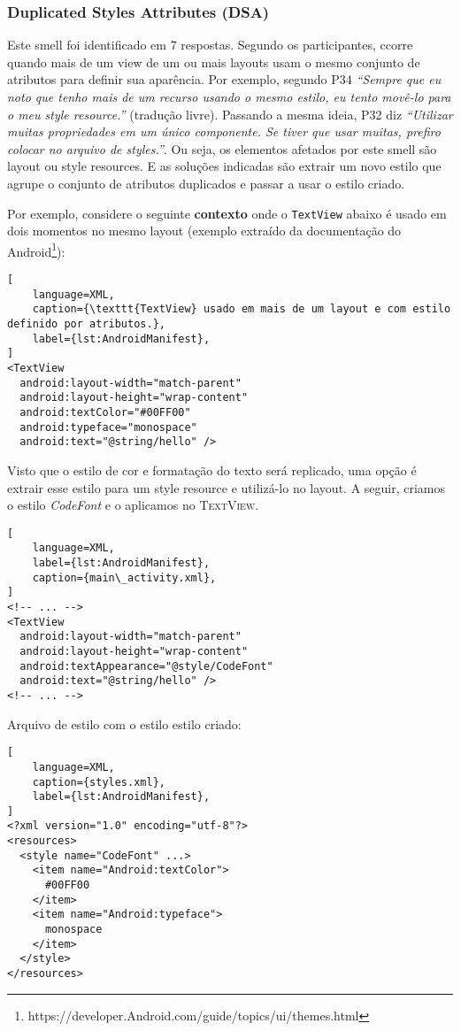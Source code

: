 \subsubsection{Duplicated Styles Attributes (DSA)}
Este smell foi identificado em 7 respostas. Segundo os participantes, ccorre quando mais de um view de um ou mais layouts usam o mesmo conjunto de atributos para definir sua apar\^encia. Por exemplo, segundo P34 \textit{``Sempre que eu noto que tenho mais de um recurso usando o mesmo estilo, eu tento mov\^e-lo para o meu \textit{style resource}.''} (tradu\c{c}\~ao livre). Passando a mesma ideia, P32 diz \textit{``Utilizar muitas propriedades em um único componente. Se tiver que usar muitas, prefiro colocar no arquivo de styles.''}. Ou seja, os elementos afetados por este smell s\~ao layout ou style resources. E as solu\c{c}\~oes indicadas s\~ao extrair um novo estilo que agrupe o conjunto de atributos duplicados e passar a usar o estilo criado.

Por exemplo, considere o seguinte \textbf{contexto} onde o \texttt{TextView} abaixo \'e usado em dois momentos no mesmo layout (exemplo extra\'ido da documenta\c{c}\~ao do Android\footnote{https://developer.Android.com/guide/topics/ui/themes.html}):

\begin{lstlisting}[
	language=XML, 
	caption={\texttt{TextView} usado em mais de um layout e com estilo definido por atributos.}, 
	label={lst:AndroidManifest},
]
<TextView
  android:layout-width="match-parent"
  android:layout-height="wrap-content"
  android:textColor="#00FF00"
  android:typeface="monospace"
  android:text="@string/hello" />
\end{lstlisting}

Visto que o estilo de cor e formata\c{c}\~ao do texto ser\'a replicado, uma op\c{c}\~ao \'e extrair esse estilo para um style resource e utiliz\'a-lo no layout. A seguir, criamos o estilo \textit{CodeFont} e o aplicamos no \textsc{TextView}.

\begin{lstlisting}[
	language=XML, 
	label={lst:AndroidManifest},
	caption={main\_activity.xml},
]
<!-- ... -->
<TextView
  android:layout-width="match-parent"
  android:layout-height="wrap-content"
  android:textAppearance="@style/CodeFont"
  android:text="@string/hello" />
<!-- ... -->
\end{lstlisting}

Arquivo de estilo com o estilo estilo  criado:

\begin{lstlisting}[
	language=XML, 
	caption={styles.xml}, 
	label={lst:AndroidManifest},
]
<?xml version="1.0" encoding="utf-8"?>
<resources>
  <style name="CodeFont" ...>
    <item name="Android:textColor">
      #00FF00
    </item>
    <item name="Android:typeface">
      monospace
    </item>
  </style>
</resources>
\end{lstlisting}


